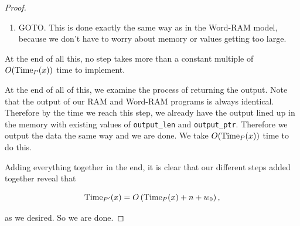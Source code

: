 \documentclass[11pt]{article}
\begin{document}
\begin{enumerate}
\begin{proof}
\begin{enumerate}
\item GOTO. This is done exactly the same way as in the Word-RAM model, because we don't have to worry about memory or values getting too large.
\end{enumerate}

At the end of all this, no step takes more than a constant multiple of $O(\mathrm{Time}_P (x))$ time to implement. 

At the end of all of this, we examine the process of returning the output. Note that the output of our RAM and Word-RAM programs is always identical. Therefore by the time we reach this step, we already have the output lined up in the memory with existing values of \texttt{output\_len} and \texttt{output\_ptr}. Therefore we output the data the same way and we are done. We take $O(\mathrm{Time}_P (x))$ time to do this.

Adding everything together in the end, it is clear that our different steps added together reveal that 

$$\mathrm{Time}_{P'}(x) = O\left(\mathrm{Time}_P(x)+n+w_0\right),$$

as we desired. So we are done.
\end{proof}

\end{enumerate}
\end{document}
